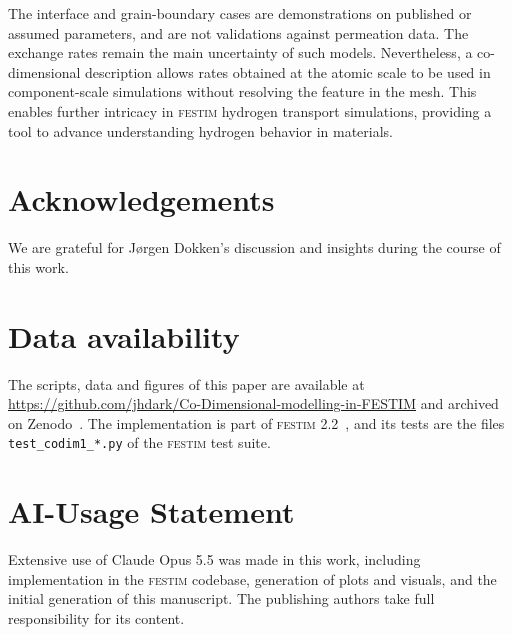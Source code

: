 \documentclass[5p]{elsarticle}
\newcommand{\FESTIM}{\textsc{festim}}
\begin{document}
The interface and grain-boundary cases are demonstrations on published or assumed parameters, and are not validations against permeation data.
The exchange rates remain the main uncertainty of such models.
Nevertheless, a co-dimensional description allows rates obtained at the atomic scale to be used in component-scale simulations without resolving the feature in the mesh. This enables further intricacy in \FESTIM{} hydrogen transport simulations, providing a tool to advance understanding hydrogen behavior in materials.  

\section*{Acknowledgements}

We are grateful for J\o{}rgen Dokken's discussion and insights during the course of this work. 

\section*{Data availability}
\label{sec:data}

The scripts, data and figures of this paper are available at \url{https://github.com/jhdark/Co-Dimensional-modelling-in-FESTIM} and archived on Zenodo~\cite{james_dark_2026_24349184}.
The implementation is part of \FESTIM{} 2.2~\cite{dark_festim_2026}, and its tests are the files \texttt{test\_codim1\_*.py} of the \FESTIM{} test suite.

\section*{AI-Usage Statement}

Extensive use of Claude Opus 5.5 was made in this work, including implementation in the \FESTIM{} codebase, generation of plots and visuals, and the initial generation of this manuscript. The publishing authors take full responsibility for its content. 




\end{document}
